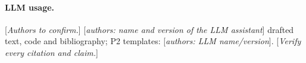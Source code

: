 \documentclass[10pt,twocolumn,letterpaper]{article}
\begin{document}
\paragraph{LLM usage.} [\emph{Authors to confirm.}] [\emph{authors: name and version of the LLM assistant}] drafted text, code and bibliography; P2 templates: [\emph{authors: LLM name/version}]. [\emph{Verify every citation and claim.}]

{\small


}
\end{document}
